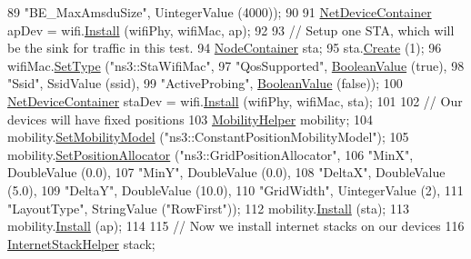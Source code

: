 \begin{DoxyCode}
89                    \textcolor{stringliteral}{"BE\_MaxAmsduSize"}, UintegerValue (4000));
90 
91   \hyperlink{classns3_1_1NetDeviceContainer}{NetDeviceContainer} apDev = wifi.\hyperlink{classns3_1_1WifiHelper_a451b3d33fa1497c22f06c5451f57a127}{Install} (wifiPhy, wifiMac, ap);
92 
93   \textcolor{comment}{// Setup one STA, which will be the sink for traffic in this test.}
94   \hyperlink{classns3_1_1NodeContainer}{NodeContainer} sta;
95   sta.\hyperlink{classns3_1_1NodeContainer_a787f059e2813e8b951cc6914d11dfe69}{Create} (1);
96   wifiMac.\hyperlink{classns3_1_1WifiMacHelper_a382d8df76a1dd7007179d1963b4b6bc6}{SetType} (\textcolor{stringliteral}{"ns3::StaWifiMac"},
97                    \textcolor{stringliteral}{"QosSupported"}, \hyperlink{classns3_1_1BooleanValue}{BooleanValue} (\textcolor{keyword}{true}),
98                    \textcolor{stringliteral}{"Ssid"}, SsidValue (ssid),
99                    \textcolor{stringliteral}{"ActiveProbing"}, \hyperlink{classns3_1_1BooleanValue}{BooleanValue} (\textcolor{keyword}{false}));
100   \hyperlink{classns3_1_1NetDeviceContainer}{NetDeviceContainer} staDev = wifi.\hyperlink{classns3_1_1WifiHelper_a451b3d33fa1497c22f06c5451f57a127}{Install} (wifiPhy, wifiMac, sta);
101 
102   \textcolor{comment}{// Our devices will have fixed positions}
103   \hyperlink{classns3_1_1MobilityHelper}{MobilityHelper} mobility;
104   mobility.\hyperlink{classns3_1_1MobilityHelper_a030275011b6f40682e70534d30280aba}{SetMobilityModel} (\textcolor{stringliteral}{"ns3::ConstantPositionMobilityModel"});
105   mobility.\hyperlink{classns3_1_1MobilityHelper_ac59d5295076be3cc11021566713a28c5}{SetPositionAllocator} (\textcolor{stringliteral}{"ns3::GridPositionAllocator"},
106                                  \textcolor{stringliteral}{"MinX"}, DoubleValue (0.0),
107                                  \textcolor{stringliteral}{"MinY"}, DoubleValue (0.0),
108                                  \textcolor{stringliteral}{"DeltaX"}, DoubleValue (5.0),
109                                  \textcolor{stringliteral}{"DeltaY"}, DoubleValue (10.0),
110                                  \textcolor{stringliteral}{"GridWidth"}, UintegerValue (2),
111                                  \textcolor{stringliteral}{"LayoutType"}, StringValue (\textcolor{stringliteral}{"RowFirst"}));
112   mobility.\hyperlink{classns3_1_1MobilityHelper_a07737960ee95c0777109cf2994dd97ae}{Install} (sta);
113   mobility.\hyperlink{classns3_1_1MobilityHelper_a07737960ee95c0777109cf2994dd97ae}{Install} (ap);
114 
115   \textcolor{comment}{// Now we install internet stacks on our devices}
116   \hyperlink{classns3_1_1InternetStackHelper}{InternetStackHelper} stack;

\end{DoxyCode}
